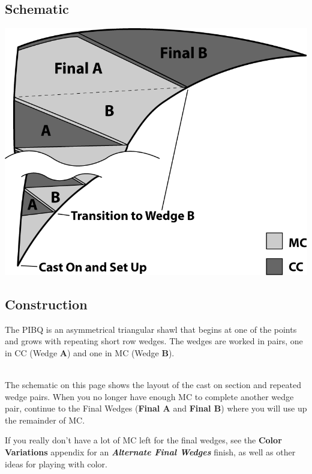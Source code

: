 \documentclass[12pt]{article}
\newcommand{\vocab}[1]{\emph{\textbf{#1}}} %
\newenvironment{frnote}
    {%
    	\def\FrameCommand{\fboxrule=\FrameRule\fboxsep=\FrameSep \fcolorbox{framecolor}{shadecolor}}
    	\MakeFramed {\advance\hsize-\width\FrameRestore}}
    {\endMakeFramed}
\begin{document}
\begin{multicols}{2}
\vspace{5em}

\subsection*{Schematic}
\includegraphics[width=\linewidth]{pics_BW/schematic_sample_BW.png}

\columnbreak

\subsection*{Construction}

The PIBQ is an asymmetrical triangular shawl that begins at one of the points and grows with repeating short row wedges. The wedges are worked in pairs, one in CC (Wedge \textbf{A}) and one in MC (Wedge \textbf{B}). 

~\\
The schematic on this page shows the layout of the cast on section and repeated wedge pairs. When you no longer have enough MC to complete another wedge pair, continue to the Final Wedges (\textbf{Final A} and \textbf{Final B}) where you will use up the remainder of MC.

\begin{frnote}
If you really don't have a lot of MC left for the final wedges, see the \textbf{Color Variations} appendix for an \vocab{Alternate Final Wedges} finish, as well as other ideas for playing with color.
\end{frnote}



\end{multicols}
\end{document}
